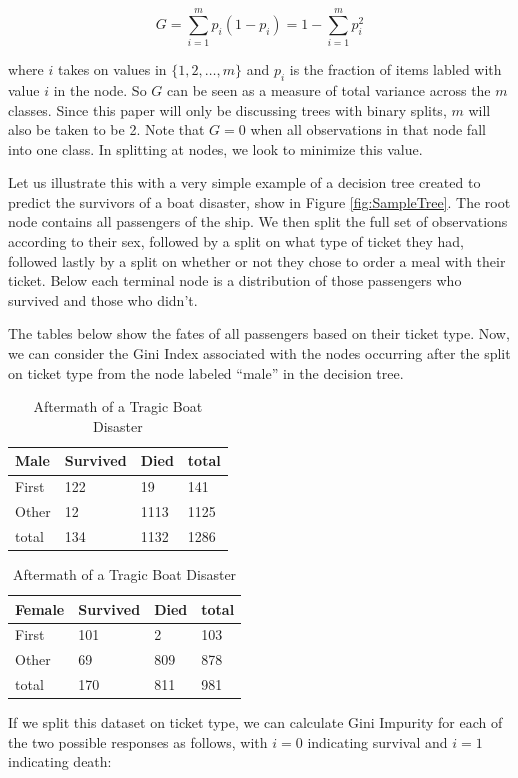 \documentclass[preprint,12pt]{elsarticle}
\begin{document}
$$G = \sum\limits_{i=1}^m p_{i}(1-p_{i}) = 1 - \sum\limits_{i=1}^m p_{i}^{2}$$

\noindent where $i$ takes on values in $\{1,2,\ldots,m\}$ and $p_i$ is the fraction of items labled with value $i$ in the node. So $G$ can be seen as a measure of total variance across the $m$ classes. Since this paper will only be discussing trees with binary splits, $m$ will also be taken to be 2. Note that $G = 0$ when all observations in that node fall into one class. In splitting at nodes, we look to minimize this value.

Let us illustrate this with a very simple example of a decision tree created to predict the survivors of a boat disaster, show in Figure \ref{fig:SampleTree}. The root node contains all passengers of the ship. We then split the full set of observations according to their sex, followed by a split on what type of ticket they had, followed lastly by a split on whether or not they chose to order a meal with their ticket. Below each terminal node is a distribution of those passengers who survived and those who didn't. 

The tables below show the fates of all passengers based on their ticket type. Now, we can consider the Gini Index associated with the nodes occurring after the split on ticket type from the node labeled ``male'' in the decision tree.

\begin{table}[h]
\begin{tabular}{|l | l l | l|}
\hline
 Male & Survived & Died & total\\
\hline
First & 122 & 19 & 141 \\
Other & 12 & 1113 & 1125 \\
\hline
total & 134 & 1132 & 1286 \\
\hline
\end{tabular}
\quad
\begin{tabular}{|l | l l | l|}
\hline
Female & Survived & Died & total\\
\hline
First & 101 & 2 & 103 \\
Other & 69 & 809 & 878 \\
\hline
total & 170 & 811 & 981 \\
\hline
\end{tabular}

\caption{Aftermath of a Tragic Boat Disaster}
\end{table}

\noindent If we split this dataset on ticket type, we can calculate Gini Impurity for each of the two possible responses as follows, with $i=0$ indicating survival and $i=1$ indicating death:
\end{document}
